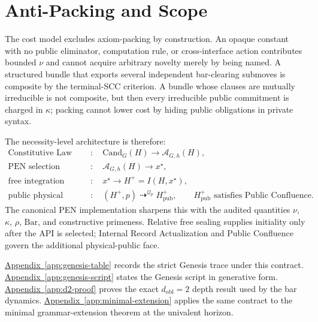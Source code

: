 \section{Anti-Packing and Scope}

The cost model excludes axiom-packing by construction. An opaque constant with
no public eliminator, computation rule, or cross-interface action contributes
bounded \(\nu\) and cannot acquire arbitrary novelty merely by being named. A
structured bundle that exports several independent bar-clearing submoves is
composite by the terminal-SCC criterion. A bundle whose clauses are mutually
irreducible is not composite, but then every irreducible public commitment is
charged in \(\kappa\); packing cannot lower cost by hiding public obligations in
private syntax.

The necessity-level architecture is therefore:
\[
\begin{aligned}
\text{Constitutive Law}
&:\quad
\mathrm{Cand}_G(H)\longrightarrow \mathcal{A}_{G,h}(H),\\
\text{PEN selection}
&:\quad
\mathcal{A}_{G,h}(H)\longrightarrow x^\star,\\
\text{free integration}
&:\quad
x^\star\longrightarrow H^+=I(H,x^\star),\\
\text{public physical sealing}
&:\quad
(H^+,p)\mathrel{\mathop{\dashrightarrow}^{\mathcal Q_p}}H^+_{\mathrm{pub}},
\qquad H^+_{\mathrm{pub}}\text{ satisfies Public Confluence}.
\end{aligned}
\]
The canonical PEN implementation sharpens this with the audited quantities
\(\nu\), \(\kappa\), \(\rho\), \(\mathrm{Bar}\), and constructive primeness.
Relative free sealing supplies initiality only after the API is selected;
Internal Record Actualization and Public Confluence govern the additional
physical-public face.

\hyperref[app:genesis-table]{Appendix~\ref*{app:genesis-table}} records the strict Genesis trace under this contract. \hyperref[app:genesis-script]{Appendix~\ref*{app:genesis-script}}
states the Genesis script in generative form. \hyperref[app:d2-proof]{Appendix~\ref*{app:d2-proof}} proves the exact
\(d_{\mathrm{obl}}=2\) depth result used by the bar dynamics. \hyperref[app:minimal-extension]{Appendix~\ref*{app:minimal-extension}} applies
the same contract to the minimal grammar-extension theorem at the univalent
horizon.
